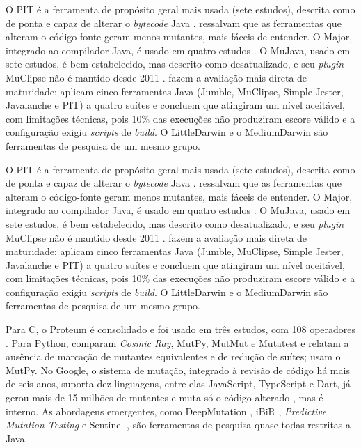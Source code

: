 O PIT é a ferramenta de propósito geral mais usada (sete estudos), descrita como de ponta e capaz de alterar o \textit{bytecode} Java \cite{assylbekov2013, ahmed2016, zhang2022}.  ressalvam que as ferramentas que alteram o código-fonte geram menos mutantes, mais fáceis de entender. O Major, integrado ao compilador Java, é usado em quatro estudos \cite{just2014, zhang2019, zhang2022}. O MuJava, usado em sete estudos, é bem estabelecido, mas descrito como desatualizado, e seu \textit{plugin} MuClipse não é mantido desde 2011 \cite{ramler2012, ashong2025a}.  fazem a avaliação mais direta de maturidade: aplicam cinco ferramentas Java (Jumble, MuClipse, Simple Jester, Javalanche e PIT) a quatro suítes e concluem que atingiram um nível aceitável, com limitações técnicas, pois 10\% das execuções não produziram escore válido e a configuração exigiu \textit{scripts} de \textit{build}. O LittleDarwin e o MediumDarwin são ferramentas de pesquisa de um mesmo grupo.

O PIT é a ferramenta de propósito geral mais usada (sete estudos), descrita como de ponta e capaz de alterar o \textit{bytecode} Java \cite{assylbekov2013, ahmed2016, zhang2022}.  ressalvam que as ferramentas que alteram o código-fonte geram menos mutantes, mais fáceis de entender. O Major, integrado ao compilador Java, é usado em quatro estudos \cite{just2014, zhang2019, zhang2022}. O MuJava, usado em sete estudos, é bem estabelecido, mas descrito como desatualizado, e seu \textit{plugin} MuClipse não é mantido desde 2011 \cite{ramler2012, ashong2025a}.  fazem a avaliação mais direta de maturidade: aplicam cinco ferramentas Java (Jumble, MuClipse, Simple Jester, Javalanche e PIT) a quatro suítes e concluem que atingiram um nível aceitável, com limitações técnicas, pois 10\% das execuções não produziram escore válido e a configuração exigiu \textit{scripts} de \textit{build}. O LittleDarwin e o MediumDarwin são ferramentas de pesquisa de um mesmo grupo.

Para C, o Proteum é consolidado e foi usado em três estudos, com 108 operadores \cite{zhang2010, kurtz2016}. Para Python,  comparam \textit{Cosmic Ray}, MutPy, MutMut e Mutatest e relatam a ausência de marcação de mutantes equivalentes e de redução de suítes;  usam o MutPy. No Google, o sistema de mutação, integrado à revisão de código há mais de seis anos, suporta dez linguagens, entre elas JavaScript, TypeScript e Dart, já gerou mais de 15 milhões de mutantes e muta só o código alterado \cite{petrovic2021}, mas é interno. As abordagens emergentes, como DeepMutation \cite{tufano2020}, iBiR \cite{khanfir2023}, \textit{Predictive Mutation Testing} \cite{zhang2019} e Sentinel \cite{guizzo2022}, são ferramentas de pesquisa quase todas restritas a Java.

